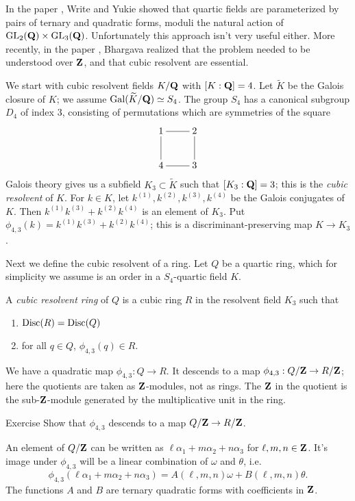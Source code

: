 In the paper \cite{wy92}, Write and Yukie showed that quartic fields are 
parameterized by pairs of ternary and quadratic forms, moduli the natural 
action of $\operatorname{GL}_2(\mathbf{Q})\times \operatorname{GL}_3(\mathbf{Q})$. Unfortunately 
this approach isn't very useful either. More recently, in the paper 
\cite{b04}, Bhargava realized that the problem needed to be understood over 
$\mathbf{Z}$, and that  cubic resolvent are essential. 

We start with cubic resolvent fields $K/\mathbf{Q}$ with $[K:\mathbf{Q}]=4$. Let 
$\widetilde K$ be the Galois closure of $K$; we assume 
$\operatorname{Gal}(\widetilde K/\mathbf{Q})\simeq S_4$. The group $S_4$ has a canonical 
subgroup $D_4$ of index $3$, consisting of permutations which are 
symmetries of the square 
\[\xymatrix{
  1 \ar@{-}[r] \ar@{-}[d] 
    & 2 \ar@{-}[d] \\
  4 \ar@{-}[r] 
    & 3
}\]
Galois theory gives us a subfield $K_3\subset \widetilde K$ such that 
$[K_3:\mathbf{Q}]=3$; this is the \emph{cubic resolvent} of $K$. For 
$k\in K$, let $k^{(1)},k^{(2)},k^{(3)},k^{(4)}$ be the Galois conjugates of 
$K$. Then $k^{(1)} k^{(3)} + k^{(2)} k^{(4)}$ is an element of $K_3$. Put 
$\phi_{4,3}(k) = k^{(1)} k^{(3)} + k^{(2)} k^{(4)}$; this is a 
discriminant-preserving map $K\to K_3$. 

Next we define the cubic resolvent of a ring. Let $Q$ be a quartic ring, which 
for simplicity we assume is an order in a $S_4$-quartic field $K$. 

\begin{defi}
A \emph{cubic resolvent ring} of $Q$ is a cubic ring $R$ in the resolvent 
field $K_3$ such that 
\begin{enumerate}
  \item $\operatorname{Disc}(R)=\operatorname{Disc}(Q)$
  \item for all $q\in Q$, $\phi_{4,3}(q)\in R$. 
\end{enumerate}
\end{defi}
We have a quadratic map $\phi_{4,3}:Q\to R$. It descends to a map 
$\phi_{4,3}:Q/\mathbf{Z} \to R/\mathbf{Z}$; here the quotients are taken as 
$\mathbf{Z}$-modules, not as rings. The $\mathbf{Z}$ in the quotient is the 
sub-$\mathbf{Z}$-module generated by the multiplicative unit in the ring. 

\begin{enonce}{Exercise}
Show that $\phi_{4,3}$ descends to a map $Q/\mathbf{Z}\to R/\mathbf{Z}$. 
\end{enonce}

An element of $Q/\mathbf{Z}$ can be written as $\ell\alpha_1+m \alpha_2 + n \alpha_3$ 
for $\ell,m,n\in \mathbf{Z}$. It's image under $\phi_{4,3}$ will be a linear combination 
of $\omega$ and $\theta$, i.e. 
\[
  \phi_{4,3}(\ell \alpha_1 + m\alpha_2 + n\alpha_3) = A(\ell,m,n) \omega + B(\ell,m,n)\theta .
\]
The functions $A$ and $B$ are ternary quadratic forms with coefficients in 
$\mathbf{Z}$. 


